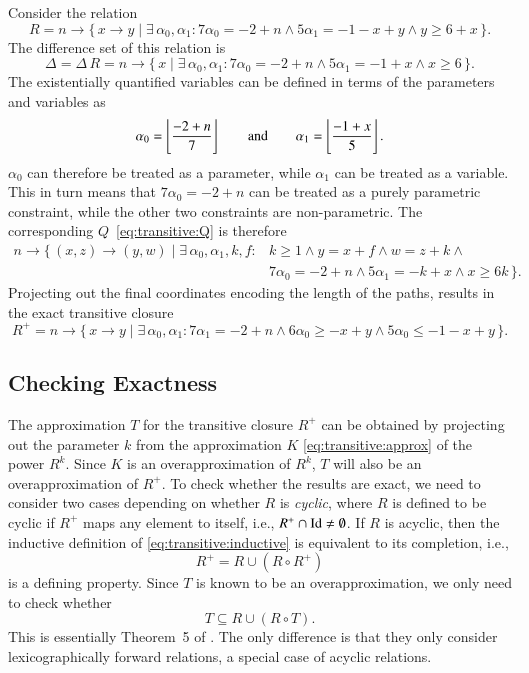 \begin{example}
Consider the relation
$$
R =
n \to \{\, x \to y \mid \exists \, \alpha_0, \alpha_1: 7\alpha_0 = -2 + n \wedge 5\alpha_1 = -1 - x + y \wedge y \ge 6 + x \,\}
.
$$
The difference set of this relation is
$$
\Delta = \Delta \, R =
n \to \{\, x \mid \exists \, \alpha_0, \alpha_1: 7\alpha_0 = -2 + n \wedge 5\alpha_1 = -1 + x \wedge x \ge 6 \,\}
.
$$
The existentially quantified variables can be defined in terms
of the parameters and variables as
$$
\alpha_0 = \left\lfloor\frac{-2 + n}7\right\rfloor
\qquad
\text{and}
\qquad
\alpha_1 = \left\lfloor\frac{-1 + x}5\right\rfloor
.
$$
$\alpha_0$ can therefore be treated as a parameter,
while $\alpha_1$ can be treated as a variable.
This in turn means that $7\alpha_0 = -2 + n$ can be treated as
a purely parametric constraint, while the other two constraints are
non-parametric.
The corresponding $Q$~\eqref{eq:transitive:Q} is therefore
$$
\begin{aligned}
n \to \{\, (x,z) \to (y,w) \mid
\exists\, \alpha_0, \alpha_1, k, f : {} &
k \ge 1 \wedge
y = x + f \wedge
w = z + k \wedge {} \\
&
7\alpha_0 = -2 + n \wedge
5\alpha_1 = -k + x \wedge
x \ge 6 k
\,\}
.
\end{aligned}
$$
Projecting out the final coordinates encoding the length of the paths,
results in the exact transitive closure
$$
R^+ =
n \to \{\, x \to y \mid \exists \, \alpha_0, \alpha_1: 7\alpha_1 = -2 + n \wedge 6\alpha_0 \ge -x + y \wedge 5\alpha_0 \le -1 - x + y \,\}
.
$$
\end{example}

\subsection{Checking Exactness}

The approximation $T$ for the transitive closure $R^+$ can be obtained
by projecting out the parameter $k$ from the approximation $K$
\eqref{eq:transitive:approx} of the power $R^k$.
Since $K$ is an overapproximation of $R^k$, $T$ will also be an
overapproximation of $R^+$.
To check whether the results are exact, we need to consider two
cases depending on whether $R$ is {\em cyclic}, where $R$ is defined
to be cyclic if $R^+$ maps any element to itself, i.e.,
$R^+ \cap \mathop{\rm Id}\nolimits \ne \emptyset$.
If $R$ is acyclic, then the inductive definition of
\eqref{eq:transitive:inductive} is equivalent to its completion,
i.e.,
$$
R^+ = R \cup \left(R \circ R^+\right)
$$
is a defining property.
Since $T$ is known to be an overapproximation, we only need to check
whether
$$
T \subseteq R \cup \left(R \circ T\right)
.
$$
This is essentially Theorem~5 of .
The only difference is that they only consider lexicographically
forward relations, a special case of acyclic relations.

